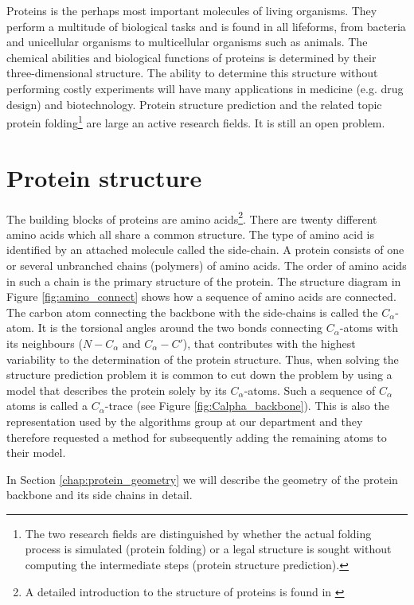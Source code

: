 Proteins is the perhaps most important molecules of living
organisms. They perform a multitude of biological tasks and is found
in all lifeforms, from bacteria and unicellular organisms to
multicellular organisms such as animals. The chemical abilities and
biological functions of proteins is determined by their
three-dimensional structure. The ability to determine this structure
without performing costly experiments will have many applications in
medicine (e.g. drug design) and biotechnology. Protein structure
prediction and the related topic protein folding\footnote{The two
  research fields are distinguished by whether the actual folding
  process is simulated (protein folding) or a legal structure is
  sought without computing the intermediate steps (protein structure
  prediction).} are large an active research fields. It is still an
open problem.

\section{Protein structure}
The building blocks of proteins are amino acids\footnote{A detailed
  introduction to the structure of proteins is found in
  \cite{branden}}. There are twenty different amino acids which all
share a common structure. The type of amino acid is identified by an
attached molecule called the side-chain. A protein consists of one or
several unbranched chains (polymers) of amino acids. The order of
amino acids in such a chain is the primary structure of the protein.
The structure diagram in Figure \ref{fig:amino_connect} shows how a
sequence of amino acids are connected. The carbon atom connecting the
backbone with the side-chains is called the $C_\alpha$-atom. It is the
torsional angles around the two bonds connecting $C_\alpha$-atoms with
its neighbours ($N-C_\alpha$ and $C_\alpha-C'$), that contributes with
the highest variability to the determination of the protein
structure. Thus, when solving the structure prediction
problem it is common  to cut down the problem by using
a model that describes the protein solely by its
$C_\alpha$-atoms. Such a sequence of $C_{\alpha}$ atoms is called a
$C_{\alpha}$-trace (see Figure \ref{fig:Calpha_backbone}). This is
also the representation used by the algorithms group at our department
and they therefore requested a method for subsequently adding the
remaining atoms to their model.

In Section \ref{chap:protein_geometry} we will describe the geometry
of the protein backbone and its side chains in detail.

